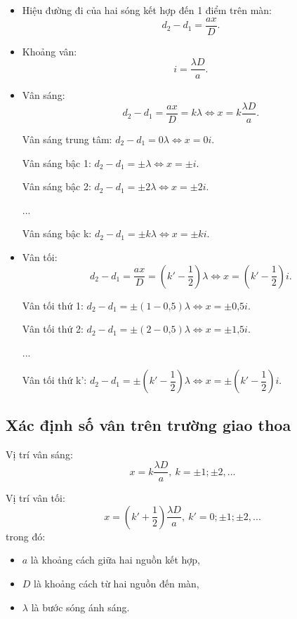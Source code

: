 \begin{itemize}
	\item Hiệu đường đi của hai sóng kết hợp đến 1 điểm trên màn: 
	\begin{equation}
		d_2-d_1=\dfrac{ax}{D}.
	\end{equation}
	\item Khoảng vân: 
	\begin{equation}
		i=\dfrac{\lambda D}{a}.
	\end{equation}
	\item Vân sáng: 
	\begin{equation}
		d_2-d_1=\dfrac{ax}{D}=k\lambda \Leftrightarrow x=k\dfrac{\lambda D}{a}.
	\end{equation}

Vân sáng trung tâm: $d_2 -d_1=0 \lambda \Leftrightarrow x= 0i$.

Vân sáng bậc 1: $d_2 -d_1=\pm  \lambda \Leftrightarrow x= \pm i$.

Vân sáng bậc 2: $d_2 -d_1=\pm  2\lambda \Leftrightarrow x= \pm 2i$.

...

Vân sáng bậc k: $d_2 -d_1=\pm  k\lambda \Leftrightarrow x= \pm ki$.

	\item Vân tối: 
	\begin{equation}
		d_2-d_1=\dfrac{ax}{D}=\left(k'-\dfrac{1}{2}\right) \lambda \Leftrightarrow x=\left(k'-\dfrac{1}{2}\right) i.
	\end{equation}

Vân tối thứ 1: $d_2 -d_1=\pm (1-\text{0,5})  \lambda \Leftrightarrow x= \pm \text{0,5} i$.

Vân tối thứ 2: $d_2 -d_1=\pm (2-\text{0,5})  \lambda \Leftrightarrow x= \pm \text{1,5} i$.

...

Vân tối thứ k': $d_2-d_1= \pm \left(k'-\dfrac{1}{2}\right) \lambda \Leftrightarrow  x=\pm\left(k'-\dfrac{1}{2}\right) i$.
\end{itemize}

\subsection{Xác định số vân trên trường giao thoa}


Vị trí vân sáng:
\begin{equation}
	x=k\dfrac{\lambda D}{a},\ k=\pm 1; \pm 2,...
\end{equation}

Vị trí vân tối: 
\begin{equation}
	x=\left(k'+\dfrac{1}{2}\right) \dfrac{\lambda D}{a},\ k'=0; \pm 1; \pm 2,... 
\end{equation}
trong đó:
\begin{itemize}
	\item $a$ là khoảng cách giữa hai nguồn kết hợp,
	\item $D$ là khoảng cách từ hai nguồn đến màn,
	\item $\lambda$ là bước sóng ánh sáng.
\end{itemize} 

